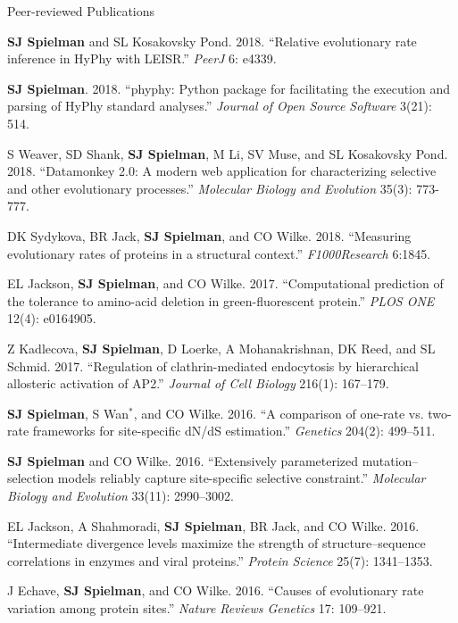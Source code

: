 \documentclass{resume} %
\begin{document}
\begin{rSection}{Peer-reviewed Publications}
\begin{etaremune}[leftmargin=1.5em]
\item \textbf{SJ Spielman} and SL Kosakovsky Pond. 2018. ``Relative evolutionary rate inference in HyPhy with LEISR.'' \emph{PeerJ} 6: e4339.

\item \textbf{SJ Spielman}. 2018. ``phyphy: Python package for facilitating the execution and parsing of HyPhy standard analyses.''  \emph{Journal of Open Source Software} 3(21): 514.

\item S Weaver, SD Shank, \textbf{SJ Spielman}, M Li, SV Muse, and SL Kosakovsky Pond. 2018. ``Datamonkey 2.0: A modern web application for characterizing selective and other evolutionary processes.'' \emph{Molecular Biology and Evolution} 35(3): 773-777.

\item DK Sydykova, BR Jack, \textbf{SJ Spielman}, and CO Wilke. 2018. ``Measuring evolutionary rates of proteins in a structural context.'' \emph{F1000Research} 6:1845.

\item EL Jackson, \textbf{SJ Spielman}, and CO Wilke. 2017. ``Computational prediction of the tolerance to amino-acid deletion in green-fluorescent protein.'' \emph{PLOS ONE} 12(4): e0164905.

\item Z Kadlecova, \textbf{SJ Spielman}, D Loerke, A Mohanakrishnan, DK Reed, and SL Schmid. 2017. ``Regulation of clathrin-mediated endocytosis by hierarchical allosteric activation of AP2.'' \emph{Journal of Cell Biology} 216(1): 167--179.

\item \textbf{SJ Spielman}, S Wan$^\ast$, and CO Wilke. 2016. ``A comparison of one-rate vs. two-rate frameworks for site-specific dN/dS estimation.'' \emph{Genetics} 204(2): 499--511.

\item \textbf{SJ Spielman} and CO Wilke. 2016. ``Extensively parameterized mutation--selection models reliably capture site-specific selective constraint.'' \emph{Molecular Biology and Evolution} 33(11): 2990--3002.

\item EL Jackson, A Shahmoradi, \textbf{SJ Spielman}, BR Jack, and CO Wilke. 2016. ``Intermediate divergence levels maximize the strength of structure--sequence correlations in enzymes and viral proteins.'' \emph{Protein Science} 25(7): 1341--1353.

\item J Echave, \textbf{SJ Spielman}, and CO Wilke. 2016. ``Causes of evolutionary rate variation among protein sites.'' \emph{Nature Reviews Genetics} 17: 109--921.


\end{etaremune}
\end{rSection}
\end{document}
